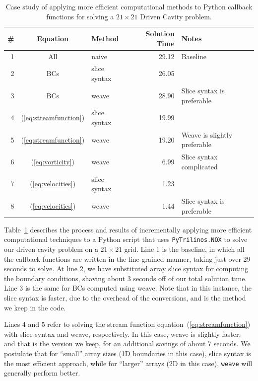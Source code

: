 \documentclass[acmtocl]{acmtrans2m}
\begin{document}
\begin{table}
  \begin{center}
    \begin{tabular}{|r|c|l|r|l|}
      \hline
      \# & Equation                 & Method       & Solution Time & Notes \\
      \hline
      1 & All                       & naive        & 29.12 & Baseline \\
      2 & BCs                       & slice syntax & 26.05 & \\
      3 & BCs                       & weave        & 28.90 & Slice syntax is preferable \\
      4 & (\ref{eq:streamfunction}) & slice syntax & 19.99 & \\
      5 & (\ref{eq:streamfunction}) & weave        & 19.20 & Weave is slightly preferable \\
      6 & (\ref{eq:vorticity})      & weave        &  6.99 & Slice syntax complicated \\
      7 & (\ref{eq:velocities})     & slice syntax &  1.23 & \\
      8 & (\ref{eq:velocities})     & weave        &  1.44 & Slice syntax is preferable \\
      \hline
    \end{tabular}
    \caption{Case study of applying more efficient computational
      methods to Python callback functions for solving a $21\times21$
      Driven Cavity problem.}
    \label{tab:callbacks}
  \end{center}
\end{table}

Table~\ref{tab:callbacks} describes the process and results of
incrementally applying more efficient computational techniques to a
Python script that uses {\tt PyTrilinos.NOX} to solve our driven
cavity problem on a $21\times21$ grid.  Line 1 is the baseline, in
which all the callback functions are written in the fine-grained
manner, taking just over 29 seconds to solve.  At line 2, we have
substituted array slice syntax for computing the boundary conditions,
shaving about 3 seconds off of our total solution time.  Line 3 is the
same for BCs computed using weave.  Note that in this instance, the
slice syntax is faster, due to the overhead of the conversions, and is
the method we keep in the code.

Lines 4 and 5 refer to solving the stream function
equation~(\ref{eq:streamfunction}) with slice syntax and weave,
respectively.  In this case, weave is slightly faster, and that is the
version we keep, for an additional savings of about 7 seconds.  We
postulate that for ``small'' array sizes (1D boundaries in this case),
slice syntax is the most efficient approach, while for ``larger''
arrays (2D in this case), {\tt weave} will generally perform better.
\end{document}
